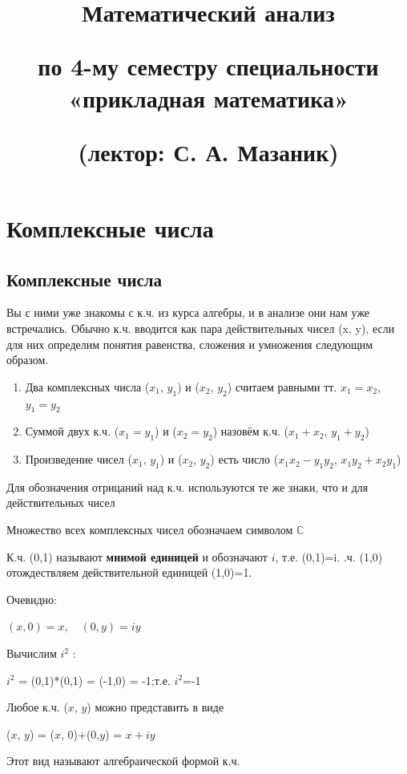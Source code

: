 \documentclass[a4paper, 12pt]{report}
\title{\textbf{\Huge{Математический анализ}}\par\bigskipКонспект по 4-му семестру
	специальности «прикладная математика»\par(лектор: С. А. Мазаник)}
\date{}
\begin{document}
\maketitle
\newpage
\tableofcontents{}
	\newpage
	
	\chapter{Комплексные числа}
	
	
	
\section{Комплексные числа}

 \quad Вы с ними уже знакомы с к.ч. из курса алгебры, и в анализе они нам уже встречались. Обычно к.ч. вводится как пара действительных чисел (x, y), если для них определим понятия равенства, сложения и умножения следующим образом.
  \par\bigskip
  \begin{enumerate}
      \item Два комплексных числа ($x_1$, $y_1$) и ($x_2$, $y_2$) считаем равными тт. $x_1=x_2$, $y_1=y_2$
      \item Суммой двух к.ч. ($x_1=y_1$) и ($x_2=y_2$) назовём к.ч. ($x_1+x_2$, $y_1+y_2$)
      \item Произведение чисел ($x_1$, $y_1$) и ($x_2$, $y_2$) есть число ($x_1 x_2-y_1y_2$, $x_1y_2+x_2y_1$)
  \end{enumerate}
  \par\bigskip
 Для обозначения отрицаний над к.ч. используются те же знаки, что и для действительных чисел
 
 Множество всех комплексных чисел обозначаем символом $\mathbb{C}$

 К.ч. (0,1) называют \textbf{мнимой единицей} и обозначают $i$, т.е. (0,1)=i. .ч. (1,0) отождествляем действительной единицей (1,0)=1.
  \par\bigskip
 Очевидно: 
  \par\bigskip 
 \quad \quad $(x, 0)=x,\quad (0, y)=iy$
  \par\bigskip 
 Вычислим $i^2$ :
  \par\bigskip 
 \quad \quad $i^2$ = (0,1)*(0,1) = (-1,0) = -1;\quad т.е. $i^2$=-1
  \par\bigskip
 Любое к.ч. ($x$, $y$) можно представить в виде
  \par\bigskip
 \quad \quad ($x$, $y$) = ($x$, 0)+(0,$y$) = $x+iy$
  \par\bigskip
 Этот вид называют алгебраической формой к.ч.
\end{document}
